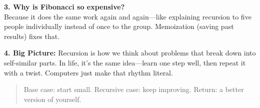 \vspace{0.8em}
\textbf{3. Why is Fibonacci so expensive?}\\
Because it does the same work again and again—like explaining recursion to five people individually instead of once to the group.  
Memoization (saving past results) fixes that.  

\vspace{0.8em}
\textbf{4. Big Picture:}  
Recursion is how we think about problems that break down into self-similar parts.  
In life, it’s the same idea—learn one step well, then repeat it with a twist.  
Computers just make that rhythm literal.  
\begin{quote}
Base case: start small.  
Recursive case: keep improving.  
Return: a better version of yourself.
\end{quote}

